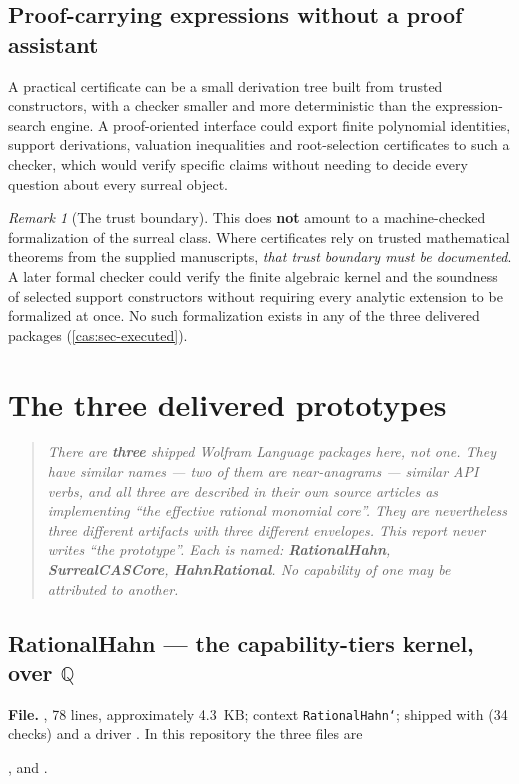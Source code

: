 \documentclass[11pt,letterpaper]{article}
\numberwithin{equation}{section}
\theoremstyle{definition}
\theoremstyle{remark}
\newtheorem{remark}[theorem]{Remark}
\newcommand{\Q}{\mathbb Q}
\begin{document}
\subsection{Proof-carrying expressions without a proof assistant}
\label{cas:sub-proofcarrying}
A practical certificate can be a small derivation tree built from trusted
constructors, with a checker smaller and more deterministic than the
expression-search engine. A proof-oriented interface could export finite
polynomial identities, support derivations, valuation inequalities and
root-selection certificates to such a checker, which would verify specific
claims without needing to decide every question about every surreal object.

\begin{remark}[The trust boundary]\label{cas:rem-trust}
This does \textbf{not} amount to a machine-checked formalization of the surreal
class. Where certificates rely on trusted mathematical theorems from the
supplied manuscripts, \emph{that trust boundary must be documented}. A later
formal checker could verify the finite algebraic kernel and the soundness of
selected support constructors without requiring every analytic extension to be
formalized at once. No such formalization exists in any of the three delivered
packages (\cref{cas:sec-executed}).
\end{remark}

\section{The three delivered prototypes}
\label{cas:sec-prototypes}

\begin{quote}\small\itshape
There are \textbf{three} shipped Wolfram Language packages here, not one. They
have similar names --- two of them are near-anagrams --- similar API verbs, and
all three are described in their own source articles as implementing ``the
effective rational monomial core''. They are nevertheless three different
artifacts with three different envelopes. This report never writes ``the
prototype''. Each is named: \textbf{RationalHahn}, \textbf{SurrealCASCore},
\textbf{HahnRational}. No capability of one may be attributed to another.
\end{quote}

\subsection{RationalHahn --- the capability-tiers kernel, over \texorpdfstring{$\Q$}{Q}}
\label{cas:sub-rationalhahn}
\textbf{File.} , 78 lines, approximately 4.3~KB; context
\texttt{RationalHahn`}; shipped with  (34 checks) and a driver
. In this repository the three files are
\begin{sloppypar}\noindent
{},
 and
.
\end{sloppypar}
\end{document}
